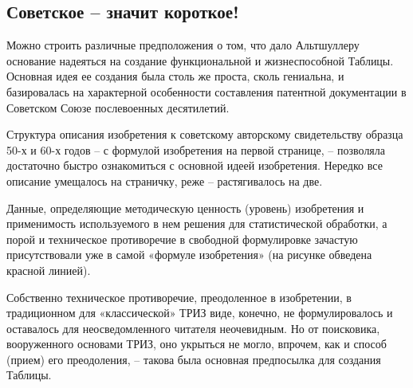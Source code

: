 \documentclass[11pt,a4paper]{article}
\begin{document}
\subsection*{Советское -- значит короткое!}

Можно строить различные предположения о том, что дало Альтшуллеру основание
надеяться на создание функциональной и жизнеспособной Таблицы. Основная идея
ее создания была столь же проста, сколь гениальна, и базировалась на
характерной особенности составления патентной документации в Советском Союзе
послевоенных десятилетий.

Структура описания изобретения к советскому авторскому свидетельству образца
50-х и 60-х годов -- с формулой изобретения на первой странице, -- позволяла
достаточно быстро ознакомиться с основной идеей изобретения. Нередко все
описание умещалось на страничку, реже -- растягивалось на две.

Данные, определяющие методическую ценность (уровень) изобретения и
применимость используемого в нем решения для статистической обработки, а порой
и техническое противоречие в свободной формулировке зачастую присутствовали
уже в самой «формуле изобретения» (на рисунке обведена красной линией).

Собственно техническое противоречие, преодоленное в изобретении, в
традиционном для «классической» ТРИЗ виде, конечно, не формулировалось и
оставалось для неосведомленного читателя неочевидным. Но от поисковика,
вооруженного основами ТРИЗ, оно укрыться не могло, впрочем, как и способ
(прием) его преодоления, -- такова была основная предпосылка для создания
Таблицы.
\end{document}
